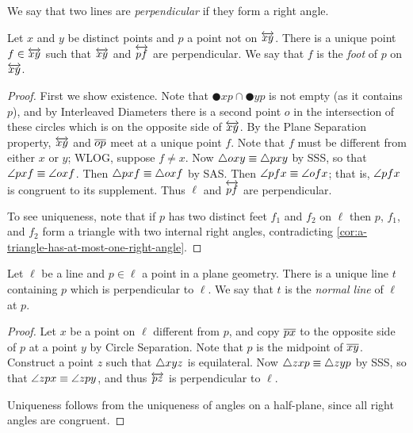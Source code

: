 We say that two lines are \emph{perpendicular} if they form a right angle.

\begin{construct}\label{construct:foot}
Let \(x\) and \(y\) be distinct points and \(p\) a point not on \(\overleftrightarrow{xy}\).
There is a unique point \(f \in \overleftrightarrow{xy}\) such that \(\overleftrightarrow{xy}\) and \(\overleftrightarrow{pf}\) are perpendicular.
We say that \(f\) is the \emph{foot} of \(p\) on \(\overleftrightarrow{xy}\).
\end{construct}

\begin{proof}
First we show existence.
Note that \(\CIRCLE{x}{p} \cap \CIRCLE{y}{p}\) is not empty (as it contains \(p\)), and by Interleaved Diameters there is a second point \(o\) in the intersection of these circles which is on the opposite side of \(\overleftrightarrow{xy}\).
By the Plane Separation property, \(\overleftrightarrow{xy}\) and \(\overline{op}\) meet at a unique point \(f\).
Note that \(f\) must be different from either \(x\) or \(y\); WLOG, suppose \(f \neq x\).
Now \(\bigtriangleup{oxy} \equiv \bigtriangleup{pxy}\) by SSS, so that \(\angle{pxf} \equiv \angle{oxf}\).
Then \(\bigtriangleup{pxf} \equiv \bigtriangleup{oxf}\) by SAS.
Then \(\angle{pfx} \equiv \angle{ofx}\); that is, \(\angle{pfx}\) is congruent to its supplement. Thus \(\ell\) and \(\overleftrightarrow{pf}\) are perpendicular.

To see uniqueness, note that if \(p\) has two distinct feet \(f_1\) and \(f_2\) on \(\ell\) then \(p\), \(f_1\), and \(f_2\) form a triangle with two internal right angles, contradicting \ref{cor:a-triangle-has-at-most-one-right-angle}.
\end{proof}

\begin{construct}
Let \(\ell\) be a line and \(p \in \ell\) a point in a plane geometry.
There is a unique line \(t\) containing \(p\) which is perpendicular to \(\ell\).
We say that \(t\) is the \emph{normal line} of \(\ell\) at \(p\).
\end{construct}

\begin{proof}
Let \(x\) be a point on \(\ell\) different from \(p\), and copy \(\overline{px}\) to the opposite side of \(p\) at a point \(y\) by Circle Separation.
Note that \(p\) is the midpoint of \(\overline{xy}\).
Construct a point \(z\) such that \(\bigtriangleup{xyz}\) is equilateral.
Now \(\bigtriangleup{zxp} \equiv \bigtriangleup{zyp}\) by SSS, so that \(\angle{zpx} \equiv \angle{zpy}\), and thus \(\overleftrightarrow{pz}\) is perpendicular to \(\ell\).

Uniqueness follows from the uniqueness of angles on a half-plane, since all right angles are congruent.
\end{proof}

